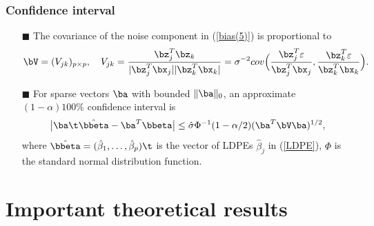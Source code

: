 \begin{frame}
\frametitle{Confidence interval}
\scriptsize
\begin{itemize}
\item[$\blacksquare$] The covariance of the noise component in (\ref{bias(5)}) is proportional to
\begin{equation}
\bV=(V_{jk})_{p\times p},\quad V_{jk} = \frac{\bz_j^T\bz_k}{|\bz_j^T\bx_j||\bz_k^T\bx_k|}
= \sigma^{-2} cov \Big(\frac{\bz_j^T\varepsilon}{\bz_j^T\bx_j}, \frac{\bz_k^T\varepsilon}{\bz_k^T\bx_k}\Big).
\end{equation}

\item[$\blacksquare$]
For sparse vectors $\ba$ with bounded $\|\ba\|_0$,
an approximate $(1-\alpha)100\%$ confidence interval is
\begin{equation}
\label{LDPE-CI}
\big|\ba \t \hat{\bbeta} - \ba^T\bbeta\big| \le \hat{\sigma}\Phi^{-1}(1-\alpha/2)(\ba^T\bV\ba)^{1/2},
\end{equation}
where $\hat{\bbeta} = (\hat{\beta}_1,\ldots,\hat{\beta}_p) \t$ is the vector of LDPEs $\hat{\beta}_j$ in (\ref{LDPE}), $\Phi$ is the standard normal distribution function.

\end{itemize}
\end{frame}


\section{Important theoretical results}
\begin{frame}
\sectionpage
\end{frame}

